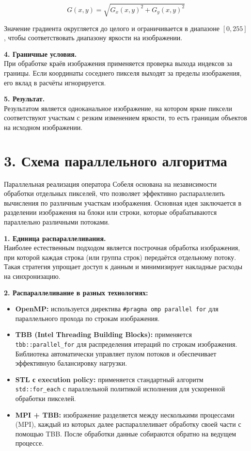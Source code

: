\documentclass{report}
\begin{document}
\[
G(x, y) = \sqrt{G_x(x, y)^2 + G_y(x, y)^2}
\]

Значение градиента округляется до целого и ограничивается в диапазоне \([0, 255]\), чтобы соответствовать диапазону яркости на изображении.

\textbf{4. Граничные условия.} \\
При обработке краёв изображения применяется проверка выхода индексов за границы. Если координаты соседнего пикселя выходят за пределы изображения, его вклад в расчёты игнорируется.

\textbf{5. Результат.} \\
Результатом является одноканальное изображение, на котором яркие пиксели соответствуют участкам с резким изменением яркости, то есть границам объектов на исходном изображении.


\newpage
\section*{3. Схема параллельного алгоритма}

\justifying
Параллельная реализация оператора Собеля основана на независимости обработки отдельных пикселей, что позволяет эффективно распараллелить вычисления по различным участкам изображения. Основная идея заключается в разделении изображения на блоки или строки, которые обрабатываются параллельно различными потоками.

\textbf{1. Единица распараллеливания.} \\
Наиболее естественным подходом является построчная обработка изображения, при которой каждая строка (или группа строк) передаётся отдельному потоку. Такая стратегия упрощает доступ к данным и минимизирует накладные расходы на синхронизацию.

\textbf{2. Распараллеливание в разных технологиях:}
\begin{itemize}
    \item \textbf{OpenMP:} используется директива \texttt{\#pragma omp parallel for} для параллельного прохода по строкам изображения.
    \item \textbf{TBB (Intel Threading Building Blocks):} применяется \texttt{tbb::parallel\_for} для распределения итераций по строкам изображения. Библиотека автоматически управляет пулом потоков и обеспечивает эффективную балансировку нагрузки.
    \item \textbf{STL с execution policy:} применяется стандартный алгоритм \texttt{std::for\_each} с параллельной политикой исполнения для ускоренной обработки пикселей.
    \item \textbf{MPI + TBB:} изображение разделяется между несколькими процессами (MPI), каждый из которых далее распараллеливает обработку своей части с помощью TBB. После обработки данные собираются обратно на ведущем процессе.
\end{itemize}
\end{document}
